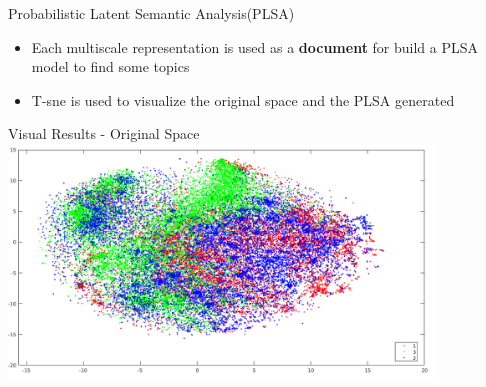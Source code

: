 \documentclass[usenames,dvipsnames]{beamer}
\begin{document}
\begin{frame}{Probabilistic Latent Semantic Analysis(PLSA)}
\begin{itemize}
\item Each multiscale representation is used as a \textbf{document} for build a PLSA model to find some topics
\pause
\item T-sne is used to visualize the original space and the PLSA generated
\end{itemize}
\end{frame}

\begin{frame}{Visual Results - Original Space}
\centering
\includegraphics[width=0.85\textwidth]{imagenes/all.png}
\end{frame}
\end{document}
